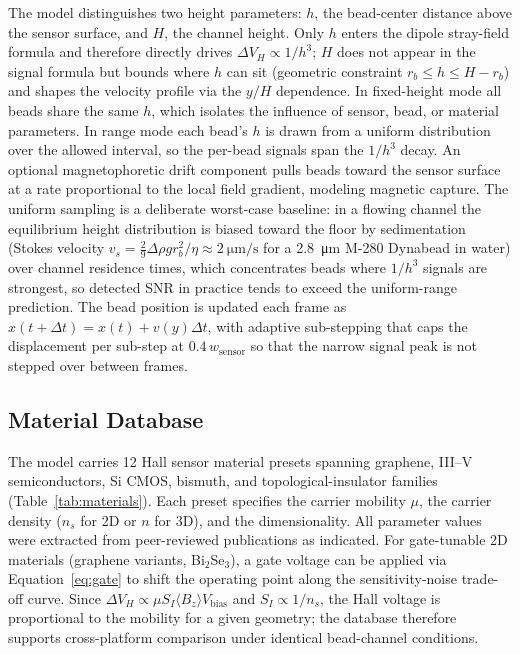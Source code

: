 \documentclass[biosensors,article,submit,pdftex,moreauthors]{Definitions/mdpi}
\begin{document}
The model distinguishes two height parameters: $h$, the bead-center distance above
the sensor surface, and $H$, the channel height. Only $h$ enters the dipole
stray-field formula and therefore directly drives $\Delta V_H \propto 1/h^3$; $H$
does not appear in the signal formula but bounds where $h$ can sit (geometric
constraint $r_b \le h \le H - r_b$) and shapes the velocity profile via the $y/H$
dependence. In fixed-height mode all beads share the same $h$, which isolates the
influence of sensor, bead, or material parameters. In range mode each bead's $h$ is
drawn from a uniform distribution over the allowed interval, so the per-bead signals
span the $1/h^3$ decay. An optional magnetophoretic drift component pulls beads
toward the sensor surface at a rate proportional to the local field gradient,
modeling magnetic capture. The uniform sampling is a deliberate worst-case baseline:
in a flowing channel the equilibrium height distribution is biased toward the floor
by sedimentation (Stokes velocity
$v_s = \tfrac{2}{9}\Delta\rho g r_b^2/\eta \approx \SI{2}{\micro\meter\per\second}$
for a \SI{2.8}{\micro\meter} M-280 Dynabead in water) over channel residence times,
which concentrates beads where $1/h^3$ signals are strongest, so detected SNR in
practice tends to exceed the uniform-range prediction. The bead position is updated
each frame as $x(t + \Delta t) = x(t) + v(y)\Delta t$, with adaptive sub-stepping
that caps the displacement per sub-step at $0.4\,w_\text{sensor}$ so that the narrow
signal peak is not stepped over between frames.

\subsection{Material Database}
\label{sec:materials}

The model carries 12 Hall sensor material presets spanning graphene, III--V
semiconductors, Si CMOS, bismuth, and topological-insulator families
(Table~\ref{tab:materials}). Each preset specifies the carrier mobility $\mu$, the
carrier density ($n_s$ for 2D or $n$ for 3D), and the dimensionality. All parameter
values were extracted from peer-reviewed publications as indicated. For gate-tunable
2D materials (graphene variants, Bi$_2$Se$_3$), a gate voltage can be applied via
Equation~\eqref{eq:gate} to shift the operating point along the sensitivity-noise
trade-off curve. Since $\Delta V_H \propto \mu S_I \langle B_z\rangle V_{\text{bias}}$
and $S_I \propto 1/n_s$, the Hall voltage is proportional to the mobility for a given
geometry; the database therefore supports cross-platform comparison under identical
bead-channel conditions.
\end{document}
